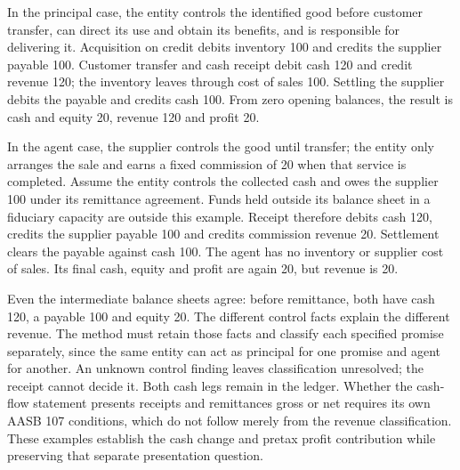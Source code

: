 In the principal case, the entity controls the identified good before
customer transfer, can direct its use and obtain its benefits, and is
responsible for delivering it. Acquisition on credit debits inventory 100
and credits the supplier payable 100. Customer transfer and cash receipt
debit cash 120 and credit revenue 120; the inventory leaves through cost
of sales 100. Settling the supplier debits the payable and credits cash 100.
From zero opening balances, the result is cash and equity 20, revenue 120
and profit 20.

In the agent case, the supplier controls the good until transfer; the entity
only arranges the sale and earns a fixed commission of 20 when that service
is completed. Assume the entity controls the collected cash and owes the
supplier 100 under its remittance agreement. Funds held outside its balance
sheet in a fiduciary capacity are outside this example. Receipt therefore
debits cash 120, credits the supplier payable 100 and credits commission
revenue 20. Settlement clears the payable against cash 100. The agent has
no inventory or supplier cost of sales. Its final cash, equity and profit
are again 20, but revenue is 20.

Even the intermediate balance sheets agree: before remittance, both have
cash 120, a payable 100 and equity 20. The different control facts explain
the different revenue. The method must retain those facts and classify each
specified promise separately, since the same entity can act as principal
for one promise and agent for another. An unknown control finding leaves
classification unresolved; the receipt cannot decide it. Both cash legs
remain in the ledger. Whether the cash-flow statement presents receipts and
remittances gross or net requires its own AASB 107 conditions, which do not
follow merely from the revenue classification. These examples establish
the cash change and pretax profit contribution while preserving that separate
presentation question.
